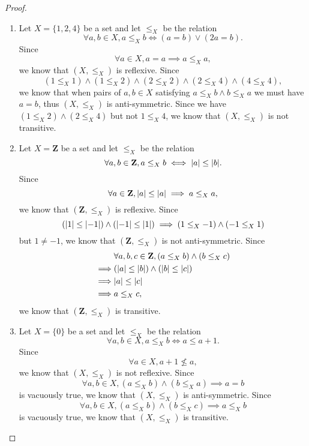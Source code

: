 \begin{proof}
    \begin{enumerate}
        \item Let \(X = \{1, 2, 4\}\) be a set and let \(\leq_X\) be the relation
              \[
                  \forall a, b \in X, a \leq_X b \iff (a = b) \lor (2a = b).
              \]
              Since
              \[
                  \forall a \in X, a = a \implies a \leq_X a,
              \]
              we know that \((X, \leq_X)\) is reflexive.
              Since
              \[
                  (1 \leq_X 1) \land (1 \leq_X 2) \land (2 \leq_X 2) \land (2 \leq_X 4) \land (4 \leq_X 4),
              \]
              we know that when pairs of \(a, b \in X\) satisfying \(a \leq_X b \land b \leq_X a\) we must have \(a = b\), thus \((X, \leq_X)\) is anti-symmetric.
              Since we have \((1 \leq_X 2) \land (2 \leq_X 4)\) but not \(1 \leq_X 4\), we know that \((X, \leq_X)\) is not transitive.
        \item Let \(X = \mathbf{Z}\) be a set and let \(\leq_X\) be the relation
              \[
                  \forall a, b \in \mathbf{Z}, a \leq_X b \iff \abs*{a} \leq \abs*{b}.
              \]
              Since
              \[
                  \forall a \in \mathbf{Z}, \abs*{a} \leq \abs*{a} \implies a \leq_X a,
              \]
              we know that \((\mathbf{Z}, \leq_X)\) is reflexive.
              Since
              \[
                  (\abs*{1} \leq \abs*{-1}) \land (\abs*{-1} \leq \abs*{1}) \implies (1 \leq_X -1) \land (-1 \leq_X 1)
              \]
              but \(1 \neq -1\), we know that \((\mathbf{Z}, \leq_X)\) is not anti-symmetric.
              Since
              \begin{align*}
                           & \forall a, b, c \in \mathbf{Z}, (a \leq_X b) \land (b \leq_X c) \\
                  \implies & (\abs*{a} \leq \abs*{b}) \land (\abs*{b} \leq \abs*{c})         \\
                  \implies & \abs*{a} \leq \abs*{c}                                          \\
                  \implies & a \leq_X c,
              \end{align*}
              we know that \((\mathbf{Z}, \leq_X)\) is transitive.
        \item Let \(X = \{0\}\) be a set and let \(\leq_X\) be the relation
              \[
                  \forall a, b \in X, a \leq_X b \iff a \leq a + 1.
              \]
              Since
              \[
                  \forall a \in X, a + 1 \not\leq a,
              \]
              we know that \((X, \leq_X)\) is not reflexive.
              Since
              \[
                  \forall a, b \in X, (a \leq_X b) \land (b \leq_X a) \implies a = b
              \]
              is vacuously true, we know that \((X, \leq_X)\) is anti-symmetric.
              Since
              \[
                  \forall a, b \in X, (a \leq_X b) \land (b \leq_X c) \implies a \leq_X b
              \]
              is vacuously true, we know that \((X, \leq_X)\) is transitive.
    \end{enumerate}
\end{proof}

